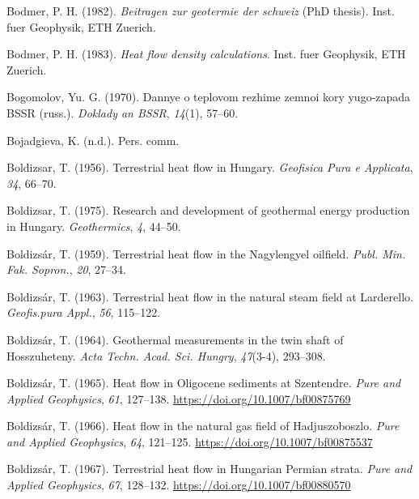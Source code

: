 \documentclass[draft,linenumbers]{agujournal2018}
\begin{document}
\leavevmode{}%
Bodmer, P. H. (1982). \emph{Beitragen zur geotermie der schweiz} (PhD
thesis). Inst. fuer Geophysik, ETH Zuerich.

\leavevmode{}%
Bodmer, P. H. (1983). \emph{Heat flow density calculations}. Inst. fuer
Geophysik, ETH Zuerich.

\leavevmode{}%
Bogomolov, Yu. G. (1970). Dannye o teplovom rezhime zemnoi kory
yugo-zapada BSSR (russ.). \emph{Doklady an BSSR}, \emph{14}(1), 57--60.

\leavevmode{}%
Bojadgieva, K. (n.d.). Pers. comm.

\leavevmode{}%
Boldizsar, T. (1956). Terrestrial heat flow in {Hungary}.
\emph{Geofisica Pura e Applicata}, \emph{34}, 66--70.

\leavevmode{}%
Boldizsar, T. (1975). Research and development of geothermal energy
production in {Hungary}. \emph{Geothermics}, \emph{4}, 44--50.

\leavevmode{}%
Boldizsár, T. (1959). Terrestrial heat flow in the {Nagylengyel}
oilfield. \emph{Publ. Min. Fak. Sopron.}, \emph{20}, 27--34.

\leavevmode{}%
Boldizsár, T. (1963). Terrestrial heat flow in the natural steam field
at {Larderello}. \emph{Geofis.pura Appl.}, \emph{56}, 115--122.

\leavevmode{}%
Boldizsár, T. (1964). Geothermal measurements in the twin shaft of
{Hosszuheteny}. \emph{Acta Techn. Acad. Sci. Hungry}, \emph{47}(3-4),
293--308.

\leavevmode{}%
Boldizsár, T. (1965). Heat flow in {Oligocene} sediments at
{Szentendre}. \emph{Pure and Applied Geophysics}, \emph{61}, 127--138.
\url{https://doi.org/10.1007/bf00875769}

\leavevmode{}%
Boldizsár, T. (1966). Heat flow in the natural gas field of
{Hadjuszoboszlo}. \emph{Pure and Applied Geophysics}, \emph{64},
121--125. \url{https://doi.org/10.1007/bf00875537}

\leavevmode{}%
Boldizsár, T. (1967). Terrestrial heat flow in {Hungarian Permian
strata}. \emph{Pure and Applied Geophysics}, \emph{67}, 128--132.
\url{https://doi.org/10.1007/bf00880570}
\end{document}
